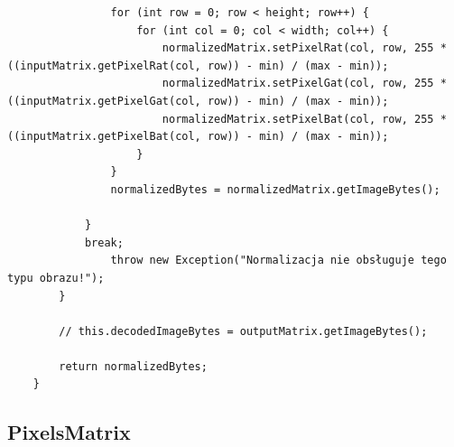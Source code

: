 \documentclass{article}
\begin{document}
\begin{verbatim}
                for (int row = 0; row < height; row++) {
                    for (int col = 0; col < width; col++) {
                        normalizedMatrix.setPixelRat(col, row, 255 * ((inputMatrix.getPixelRat(col, row)) - min) / (max - min));
                        normalizedMatrix.setPixelGat(col, row, 255 * ((inputMatrix.getPixelGat(col, row)) - min) / (max - min));
                        normalizedMatrix.setPixelBat(col, row, 255 * ((inputMatrix.getPixelBat(col, row)) - min) / (max - min));
                    }
                }
                normalizedBytes = normalizedMatrix.getImageBytes();
                
            }
            break;
                throw new Exception("Normalizacja nie obsługuje tego typu obrazu!");
        }

        // this.decodedImageBytes = outputMatrix.getImageBytes();
        
        return normalizedBytes;
    }
\end{verbatim}
	
	
	
\subsection{PixelsMatrix}
\end{document}

